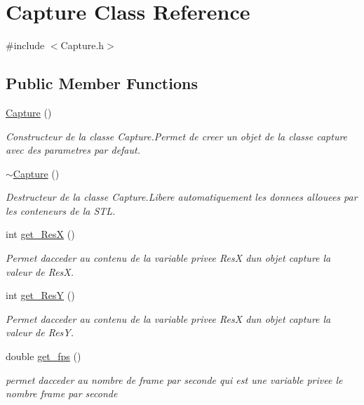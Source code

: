 \hypertarget{classCapture}{}\section{Capture Class Reference}
\label{classCapture}


{\ttfamily \#include $<$Capture.\+h$>$}

\subsection*{Public Member Functions}
\begin{DoxyCompactItemize}
\item 
\hyperlink{classCapture_a97036b5d271238bd4852da79a0091b57}{Capture} ()
\begin{DoxyCompactList}\small\item\em Constructeur de la classe Capture.\+Permet de creer un objet de la classe capture avec des parametres par defaut. \end{DoxyCompactList}\item 
\hyperlink{classCapture_ab5b3fac467fa47592126d782f9375250}{$\sim$\+Capture} ()
\begin{DoxyCompactList}\small\item\em Destructeur de la classe Capture.\+Libere automatiquement les donnees allouees par les conteneurs de la S\+TL. \end{DoxyCompactList}\item 
int \hyperlink{classCapture_a05869e8d5be568abe1886affb37369f9}{get\+\_\+\+ResX} ()
\begin{DoxyCompactList}\small\item\em Permet d\textquotesingle{}acceder au contenu de la variable privee ResX d\textquotesingle{}un objet capture  la valeur de ResX. \end{DoxyCompactList}\item 
int \hyperlink{classCapture_a3cde47ee01237a4cc85644b71ae05ff3}{get\+\_\+\+ResY} ()
\begin{DoxyCompactList}\small\item\em Permet d\textquotesingle{}acceder au contenu de la variable privee ResX d\textquotesingle{}un objet capture  la valeur de ResY. \end{DoxyCompactList}\item 
double \hyperlink{classCapture_a149cf5ddb9d6b23cdc97988307695063}{get\+\_\+fps} ()
\begin{DoxyCompactList}\small\item\em permet d\textquotesingle{}acceder au nombre de frame par seconde qui est une variable privee  le nombre frame par seconde \end{DoxyCompactList}\item 

\end{DoxyCompactItemize}
